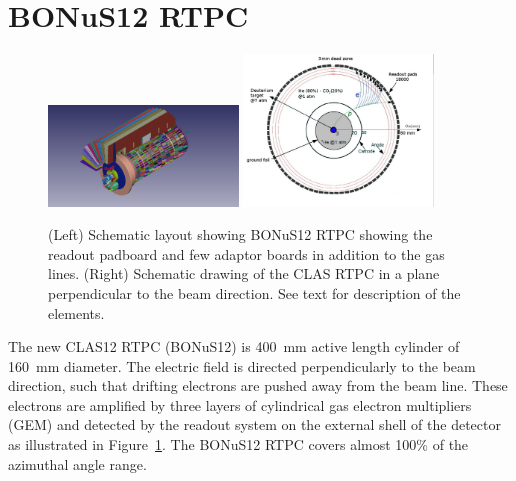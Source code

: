 \documentclass[12pt]{article}
\begin{document}
\section{BONuS12 RTPC} 

\begin{figure}[h!]
  \begin{center}
    \includegraphics[angle=0, width=0.45\textwidth,clip,
     trim=50mm 10mm 80mm 0mm]{figures/Bonus12_cad.png}
    \includegraphics[angle=0, width=0.45\textwidth,clip,
     trim=0mm 10mm 20mm 0mm ]{figures/NKsBXp.png}
     \caption{(Left) Schematic layout showing BONuS12 RTPC showing the readout 
     padboard and few adaptor boards in addition to the gas lines. (Right) 
     Schematic drawing of the CLAS RTPC in a plane perpendicular to the beam 
     direction. See text for description of the elements.}
    \label{fig:bonus12}
  \end{center}
\end{figure}

The new CLAS12 RTPC (BONuS12) is 400~mm active length cylinder of 160~mm 
diameter. The electric field is directed perpendicularly to the beam direction, 
such that drifting electrons are pushed away from the beam line.  These 
electrons are amplified by three layers of cylindrical gas electron multipliers 
(GEM) and detected by the readout system on the external shell of the detector 
as illustrated in Figure~\ref{fig:bonus12}. The BONuS12 RTPC covers almost 
100\% of the azimuthal angle range.
\end{document}
